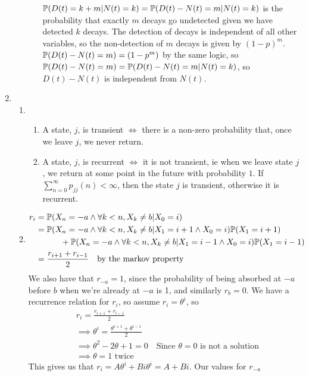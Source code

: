 \documentclass{article}
\begin{document}
\begin{enumerate}
\begin{enumerate}
\begin{enumerate}
$\mathbb{P} (D(t) = k+m | N(t) = k) = \mathbb{P}(D(t)-N(t)=m | N(t)=k)$ is the probability
that exactly $m$ decays go undetected given we have detected $k$ decays. The
detection of decays is independent of all other variables, so the non-detection
of $m$ decays is given by $(1-p)^m$. $\mathbb{P}(D(t)-N(t)=m)=(1-p^m)$ by the same
logic, so $\mathbb{P}(D(t)-N(t)=m)=\mathbb{P}(D(t)-N(t)=m|N(t)=k)$, so $D(t)-N(t)$ is
independent from $N(t)$.
\end{enumerate}
\end{enumerate}
\clearpage
\item 
\begin{enumerate}
\item
\begin{enumerate}
\item
A state, $j$, is transient $\iff$ there is a non-zero probability that, once we
leave $j$, we never return.
\item
A state, $j$, is recurrent $\iff$ it is not transient, ie when we leave state
$j$, we return at some point in the future with probability $1$. If
$\sum\limits_{n=0}^\infty p_{jj}(n) < \infty$, then the state $j$ is transient,
otherwise it is recurrent.
\end{enumerate}
\item
\begin{align*}
r_i &= \mathbb{P} (X_n = -a \wedge \forall k<n, X_k \neq b | X_0 = i)\\
&= \mathbb{P} (X_n = -a \wedge \forall k<n, X_k \neq b | X_1 = i+1 \wedge X_0 = i)\mathbb{P}
(X_1 = i+1) \\
& \quad \quad \quad + \mathbb{P}(X_n = -a \wedge \forall k<n, X_k \neq b | X_1 = i-1
\wedge X_0 = i)\mathbb{P} (X_1 = i-1)\\
&= \frac{r_{i+1} + r_{i-1}}{2} \quad \mbox{by the markov property}
\end{align*}
We also have that $r_{-a} = 1$, since the probability of being absorbed at $-a$
before $b$ when we're already at $-a$ is 1, and similarly $r_b=0$. We have a
recurrence relation for $r_i$, so assume $r_i = \theta^i$, so
\begin{align*}
& r_i = \frac{r_{i+1} + r_{i-1}}{2}\\
&\implies \theta^i = \frac{\theta^{i+1} + \theta^{i-1}}{2}\\
&\implies \theta^2-2\theta+1=0 \quad \mbox{Since $\theta = 0$ is not a
solution}\\
&\implies \theta = 1 \mbox { twice}
\end{align*}
This gives us that $r_i = A\theta^i +Bi\theta^i = A+Bi$. Our values for $r_{-a}$

\end{enumerate}
\end{enumerate}
\end{document}
